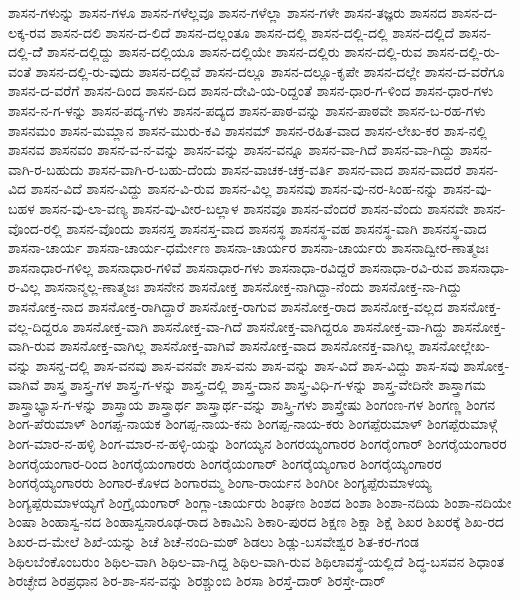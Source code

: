 ಶಾಸನ-ಗಳುನ್ನು
ಶಾಸನ-ಗಳೂ
ಶಾಸನ-ಗಳೆಲ್ಲವೂ
ಶಾಸನ-ಗಳೆಲ್ಲಾ
ಶಾಸನ-ಗಳೇ
ಶಾಸನ-ತಜ್ಞರು
ಶಾಸನದ
ಶಾಸನ-ದ-ಲಕ್ಕ-ರವ
ಶಾಸನ-ದಲಿ
ಶಾಸನ-ದ-ಲಿದೆ
ಶಾಸನ-ದಲ್ಲಂತೂ
ಶಾಸನ-ದಲ್ಲಿ
ಶಾಸನ-ದಲ್ಲಿ-ದಲ್ಲಿ
ಶಾಸನ-ದಲ್ಲಿದೆ
ಶಾಸನ-ದಲ್ಲಿ-ದೆೆ
ಶಾಸನ-ದಲ್ಲಿದ್ದು
ಶಾಸನ-ದಲ್ಲಿಯೂ
ಶಾಸನ-ದಲ್ಲಿಯೇ
ಶಾಸನ-ದಲ್ಲಿರು
ಶಾಸನ-ದಲ್ಲಿ-ರುವ
ಶಾಸನ-ದಲ್ಲಿ-ರು-ವಂತೆ
ಶಾಸನ-ದಲ್ಲಿ-ರು-ವುದು
ಶಾಸನ-ದಲ್ಲಿವೆ
ಶಾಸನ-ದಲ್ಲೂ
ಶಾಸನ-ದಲ್ಲೂ-ಕೃಪೇ
ಶಾಸನ-ದಲ್ಲೇ
ಶಾಸನ-ದ-ವರೆಗೂ
ಶಾಸನ-ದ-ವರೆಗೆ
ಶಾಸನ-ದಿಂದ
ಶಾಸನ-ದಿದ
ಶಾಸನ-ದೇವಿ-ಯ-ರಿದ್ದಂತೆ
ಶಾಸನ-ಧಾರ-ಗ-ಳಿಂದ
ಶಾಸನ-ಧಾರ-ಗಳು
ಶಾಸನ-ನ-ಗ-ಳನ್ನು
ಶಾಸನ-ಪದ್ಯ-ಗಳು
ಶಾಸನ-ಪದ್ಯದ
ಶಾಸನ-ಪಾಠ-ವನ್ನು
ಶಾಸನ-ಪಾಠವೇ
ಶಾಸನ-ಬ-ರಹ-ಗಳು
ಶಾಸನಮಂ
ಶಾಸನ-ಮಮ್ಲಾನ
ಶಾಸನ-ಮುರು-ಕವಿ
ಶಾಸನಮ್
ಶಾಸನ-ರಹಿತ-ವಾದ
ಶಾಸನ-ಲೇಖ-ಕರ
ಶಾಸ-ನಲ್ಲಿ
ಶಾಸನವ
ಶಾಸನವಂ
ಶಾಸನ-ವ-ನ-ವನ್ನು
ಶಾಸನ-ವನ್ನು
ಶಾಸನ-ವನ್ನೂ
ಶಾಸನ-ವಾ-ಗಿದೆ
ಶಾಸನ-ವಾ-ಗಿದ್ದು
ಶಾಸನ-ವಾಗಿ-ರ-ಬಹುದು
ಶಾಸನ-ವಾಗಿ-ರ-ಬಹು-ದೆಂದು
ಶಾಸನ-ವಾಚಕ-ಚಕ್ರ-ವರ್ತಿ
ಶಾಸನ-ವಾದ
ಶಾಸನ-ವಾದರೆ
ಶಾಸನ-ವಿದ
ಶಾಸನ-ವಿದೆ
ಶಾಸನ-ವಿದ್ದು
ಶಾಸನ-ವಿ-ರುವ
ಶಾಸನ-ವಿಲ್ಲ
ಶಾಸನವು
ಶಾಸನ-ವು-ನರ-ಸಿಂಹ-ನನ್ನು
ಶಾಸನ-ವು-ಬಹಳ
ಶಾಸನ-ವು-ಲಾ-ವಣ್ಯ
ಶಾಸನ-ವು-ವೀರ-ಬಲ್ಲಾಳ
ಶಾಸನವೂ
ಶಾಸನ-ವೆಂದರೆ
ಶಾಸನ-ವೆಂದು
ಶಾಸನವೇ
ಶಾಸನ-ವೊಂದ-ರಲ್ಲಿ
ಶಾಸನ-ವೊಂದು
ಶಾಸನಸ್ತ
ಶಾಸನಸ್ತ-ವಾದ
ಶಾಸನಸ್ಥ
ಶಾಸನಸ್ಥ-ವಹ
ಶಾಸನಸ್ಥ-ವಾಗಿ
ಶಾಸನಸ್ಥ-ವಾದ
ಶಾಸನಾ-ಚಾರ್ಯ
ಶಾಸನಾ-ಚಾರ್ಯ-ಧರ್ಮೇಣ
ಶಾಸನಾ-ಚಾರ್ಯರ
ಶಾಸನಾ-ಚಾರ್ಯರು
ಶಾಸನಾದ್ವೀರ-ಣಾತ್ಮಜಃ
ಶಾಸನಾಧಾರ-ಗಳಿಲ್ಲ
ಶಾಸನಾಧಾರ-ಗಳಿವೆ
ಶಾಸನಾಧಾರ-ಗಳು
ಶಾಸನಾಧಾ-ರವಿದ್ದರೆ
ಶಾಸನಾಧಾ-ರವಿ-ರುವ
ಶಾಸನಾಧಾ-ರ-ವಿಲ್ಲ
ಶಾಸನಾನ್ಮಲ್ಲ-ಣಾತ್ಮಜಃ
ಶಾಸನೇನ
ಶಾಸನೋಕ್ತ
ಶಾಸನೋಕ್ತ-ನಾಗಿದ್ದಾ-ನೆಂದು
ಶಾಸನೋಕ್ತ-ನಾ-ಗಿದ್ದು
ಶಾಸನೋಕ್ತ-ನಾದ
ಶಾಸನೋಕ್ತ-ರಾಗಿದ್ದಾರೆ
ಶಾಸನೋಕ್ತ-ರಾಗುವ
ಶಾಸನೋಕ್ತ-ರಾದ
ಶಾಸನೋಕ್ತ-ವಲ್ಲದ
ಶಾಸನೋಕ್ತ-ವಲ್ಲ-ದಿದ್ದರೂ
ಶಾಸನೋಕ್ತ-ವಾಗಿ
ಶಾಸನೋಕ್ತ-ವಾ-ಗಿದೆ
ಶಾಸನೋಕ್ತ-ವಾಗಿದ್ದರೂ
ಶಾಸನೋಕ್ತ-ವಾ-ಗಿದ್ದು
ಶಾಸನೋಕ್ತ-ವಾಗಿ-ರುವ
ಶಾಸನೋಕ್ತ-ವಾಗಿಲ್ಲ
ಶಾಸನೋಕ್ತ-ವಾಗಿವೆ
ಶಾಸನೋಕ್ತ-ವಾದ
ಶಾಸನೋನಕ್ತ-ವಾಗಿಲ್ಲ
ಶಾಸನೋಲ್ಲೇಖ-ವನ್ನು
ಶಾಸನ್ದ-ದಲ್ಲಿ
ಶಾಸ-ವನವು
ಶಾಸ-ವನವೇ
ಶಾಸ-ವನು
ಶಾಸ-ವನ್ನು
ಶಾಸ-ವಿದೆ
ಶಾಸ-ವಿದ್ದು
ಶಾಸ-ಸವು
ಶಾಸೋಕ್ತ-ವಾಗಿವೆ
ಶಾಸ್ತ್ರ
ಶಾಸ್ತ್ರ-ಗಳ
ಶಾಸ್ತ್ರ-ಗ-ಳನ್ನು
ಶಾಸ್ತ್ರ-ದಲ್ಲಿ
ಶಾಸ್ತ್ರ-ದಾನ
ಶಾಸ್ತ್ರ-ವಿಧಿ-ಗ-ಳನ್ನು
ಶಾಸ್ತ್ರ-ವೇದಿನೇ
ಶಾಸ್ತ್ರಾಗಮ
ಶಾಸ್ತ್ರಾಭ್ಯಾಸ-ಗ-ಳನ್ನು
ಶಾಸ್ತ್ರಾಯ
ಶಾಸ್ತ್ರಾರ್ಥ
ಶಾಸ್ತ್ರಾರ್ಥ-ವನ್ನು
ಶಾಸ್ತ್ರಿ-ಗಳು
ಶಾಸ್ತ್ರೇಷು
ಶಿಂಗಂಣ-ಗಳ
ಶಿಂಗಣ್ಣ
ಶಿಂಗನ
ಶಿಂಗ-ಪೆರುಮಾಳ್
ಶಿಂಗಪ್ಪ-ನಾಯಕ
ಶಿಂಗಪ್ಪ-ನಾಯ-ಕನು
ಶಿಂಗಪ್ಪ-ನಾಯ-ಕರು
ಶಿಂಗಪ್ಪೆರುಮಾಳ್
ಶಿಂಗಪ್ಪೆರುಮಾಳ್ಗೆ
ಶಿಂಗ-ಮಾರ-ನ-ಹಳ್ಳಿ
ಶಿಂಗ-ಮಾರ-ನ-ಹಳ್ಳಿ-ಯನ್ನು
ಶಿಂಗಯ್ಯನ
ಶಿಂಗರಯ್ಯಂಗಾರರ
ಶಿಂಗರೈಂಗಾರ್
ಶಿಂಗರೈಯಂಗಾರರ
ಶಿಂಗರೈಯಂಗಾರ-ರಿಂದ
ಶಿಂಗರೈಯಂಗಾರರು
ಶಿಂಗರೈಯಂಗಾರ್
ಶಿಂಗರೈಯ್ಯಂಗಾರ
ಶಿಂಗರೈಯ್ಯಂಗಾರರ
ಶಿಂಗರೈಯ್ಯಂಗಾರರು
ಶಿಂಗಾರ-ಕೊಳದ
ಶಿಂಗಾರಮ್ಮ
ಶಿಂಗಾ-ರಾರ್ಯನ
ಶಿಂಗಿರೀ
ಶಿಂಗ್ಯಪ್ಪೆರುಮಾಳಯ್ಯ
ಶಿಂಗ್ಯಪ್ಪೆರುಮಾಳಯ್ಯಗೆ
ಶಿಂಗ್ರೈಯಂಗಾರ್
ಶಿಂಗ್ಲಾ-ಚಾರ್ಯರು
ಶಿಂಘಣ
ಶಿಂಶದ
ಶಿಂಶಾ
ಶಿಂಶಾ-ನದಿಯ
ಶಿಂಶಾ-ನದಿಯೇ
ಶಿಂಷಾ
ಶಿಂಹಾಸ್ವ-ನದ
ಶಿಂಹಾಸ್ವನಾರೂಢ-ರಾದ
ಶಿಕಾಮಿನಿ
ಶಿಕಾರಿ-ಪುರದ
ಶಿಕ್ಷಣ
ಶಿಕ್ಷಾ
ಶಿಕ್ಷೆ
ಶಿಖರ
ಶಿಖರಕ್ಕೆ
ಶಿಖ-ರದ
ಶಿಖರ-ದ-ಮೇಲೆ
ಶಿಖೆ-ಯನ್ನು
ಶಿಚೆ
ಶಿಚೆ-ನಂದಿ-ಮಠ್
ಶಿಡಲು
ಶಿಡ್ಲು-ಬಸವೇಶ್ವರ
ಶಿತ-ಕರ-ಗಂಡ
ಶಿಥಿಲಬೆಂಕೊಂಬರುಂ
ಶಿಥಿಲ-ವಾಗಿ
ಶಿಥಿಲ-ವಾ-ಗಿದ್ದ
ಶಿಥಿಲ-ವಾಗಿ-ರುವ
ಶಿಥಿಲಾವಸ್ಥೆ-ಯಲ್ಲಿದೆ
ಶಿದ್ಧ-ಬಸವನ
ಶಿಧಾಂತ
ಶಿರಚ್ಛೇದ
ಶಿರಪ್ರಧಾನ
ಶಿರ-ಶಾ-ಸನ-ವನ್ನು
ಶಿರಶ್ಚುಂಬಿ
ಶಿರಸಾ
ಶಿರಸ್ತೆ-ದಾರ್
ಶಿರಸ್ತೇ-ದಾರ್

